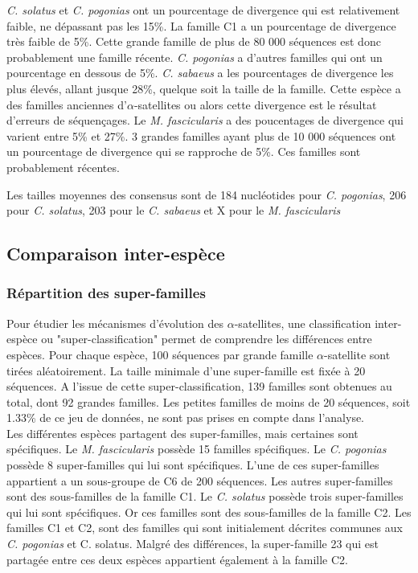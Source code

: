 \documentclass[12pt,a4paper]{article}
\begin{document}
	\textit{C. solatus} et \textit{C. pogonias} ont un pourcentage de divergence qui est relativement faible, ne dépassant pas les 15\%. La  famille C1 a un pourcentage de divergence très faible de 5\%. Cette grande famille de plus de 80 000 séquences est donc probablement une famille récente.  \textit{C. pogonias} a d'autres familles qui ont un pourcentage en dessous de 5\%.
	\textit{C. sabaeus} a les pourcentages de divergence les plus élevés, allant jusque 28\%, quelque soit la taille de la famille. Cette espèce a des familles anciennes d'$\alpha$-satellites ou alors cette divergence est le résultat d'erreurs de séquençages. Le \textit{M. fascicularis} a des poucentages de divergence qui varient entre 5\% et 27\%. 3 grandes familles ayant plus de 10 000 séquences ont un pourcentage de divergence qui se rapproche de 5\%. Ces familles sont probablement récentes.
	
	Les tailles moyennes des consensus sont de 184 nucléotides pour \textit{C. pogonias}, 206 pour \textit{C. solatus}, 203 pour le \textit{C. sabaeus} et X pour le \textit{M. fascicularis}


	
	\subsection{Comparaison inter-espèce}
	\subsubsection{Répartition des super-familles}
				Pour étudier les mécanismes d'évolution des $\alpha$-satellites, une classification inter-espèce ou "super-classification" permet de comprendre les différences entre espèces. Pour chaque espèce, 100 séquences par grande famille  $\alpha$-satellite sont tirées aléatoirement. La taille minimale d'une super-famille est fixée à 20 séquences. A l'issue de cette super-classification, 139 familles sont obtenues au total, dont 92 grandes familles. Les petites familles de moins de 20 séquences, soit 1.33\% de ce jeu de données, ne sont pas prises en compte dans l'analyse.\\
				
				Les différentes espèces partagent des super-familles, mais certaines sont spécifiques. Le \textit{M. fascicularis} possède 15 familles spécifiques. Le \textit{C. pogonias} possède 8 super-familles qui lui sont spécifiques. L'une de ces super-familles appartient a un sous-groupe de C6 de 200 séquences. Les autres super-familles sont des sous-familles de la famille C1. Le \textit{C. solatus} possède trois super-familles qui lui sont spécifiques. Or ces familles sont des sous-familles de la famille C2. Les familles C1 et C2, sont des familles qui sont initialement décrites communes aux \textit{C. pogonias} et {C. solatus}. Malgré des différences, la super-famille 23 qui est partagée entre ces deux espèces appartient également à la famille C2.
				
\end{document}
